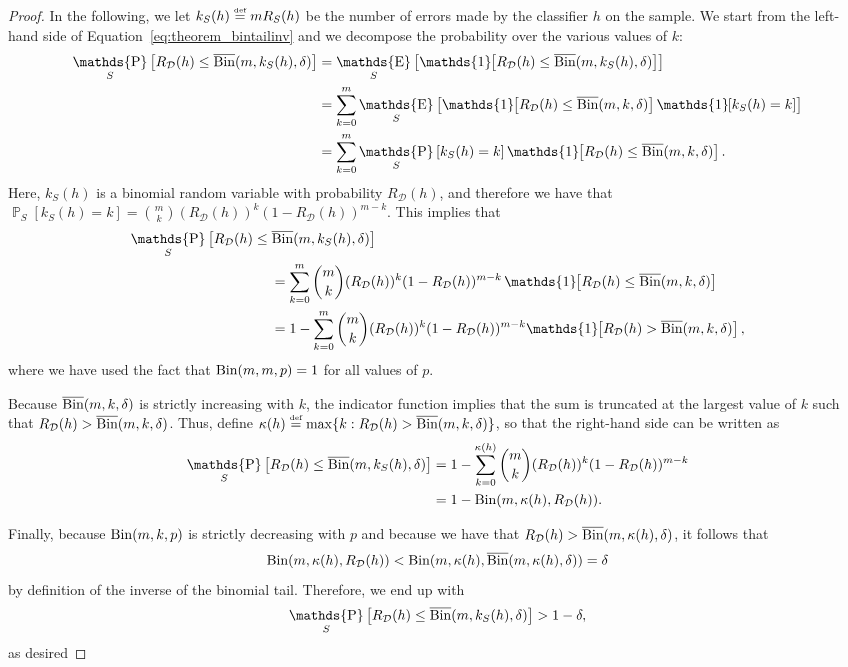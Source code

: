 \documentclass[twoside,11pt]{article}
\newcommand{\Id}[1]{\mathds{1}\hspace{-2.5pt}\left[#1\right]}
\newcommand{\D}{\mathcal{D}}
\newcommand{\eqdef}{\overset{\smash{\mbox{\tiny \rm def}}}{=}}
\DeclareMathOperator*{\Prob}{\mathds{P}}
\newcommand{\prob}[2]{\Prob_{#1}\left[#2\right]}
\DeclareMathOperator*{\Expectation}{\mathds{E}}
\newcommand{\exv}[2]{\Expectation_{#1}\left[#2\right]}
\newcommand{\Bin}{\textnormal{Bin}}
\newcommand{\BinInv}{\overline{\textnormal{Bin}}}
\begin{document}
\begin{proof}
In the following, we let $k_S(h) \eqdef m R_S(h)$ be the number of errors made by the classifier $h$ on the sample.
We start from the left-hand side of Equation~\eqref{eq:theorem_bintailinv} and we decompose the probability over the various values of $k$:
\begin{align*}
\prob{S}{R_\D(h) \leq \BinInv(m, k_S(h), \delta)}
	&= \exv{S}{ \Id{R_\D(h)\leq \BinInv(m, k_S(h), \delta)} }\\
	&= \sum_{k=0}^{m} \exv{S}{ \Id{R_\D(h)\leq \BinInv(m, k, \delta)} \Id{k_S(h) = k} }\\
	&= \sum_{k=0}^{m} \prob{S}{ k_S(h) = k } \Id{R_\D(h)\leq \BinInv(m, k, \delta)}.
\end{align*}
Here, $k_S(h)$ is a binomial random variable with probability $R_\D(h)$, and therefore we have that $\prob{S}{ k_S(h) = k } = \binom{m}{k} (R_\D(h))^k (1 - R_\D(h))^{m-k}$.
This implies that 
\begin{align*}
\prob{S}{R_\D(h) \leq \BinInv(m, k_S(h), \delta)}&\\
	&\hspace{-75pt}= \sum_{k=0}^{m} \binom{m}{k} (R_\D(h))^k (1 - R_\D(h))^{m-k}\, \Id{R_\D(h)\leq \BinInv(m, k, \delta)}\\
	&\hspace{-75pt}=1 - \sum_{k=0}^{m} \binom{m}{k} (R_\D(h))^k (1 - R_\D(h))^{m-k} \Id{R_\D(h)> \BinInv(m, k, \delta)},
\end{align*}
where we have used the fact that $\Bin(m, m, p) = 1$ for all values of $p$.

Because $\BinInv(m,k,\delta)$ is strictly increasing with $k$, the indicator function implies that the sum is truncated at the largest value of $k$ such that $R_\D(h) > \BinInv(m,k,\delta)$.
Thus, define $\kappa(h) \eqdef \max\{ k:R_\D(h) > \BinInv(m,k,\delta)\}$, so that the right-hand side can be written as
\begin{align*}
\prob{S}{R_\D(h) \leq \BinInv(m, k_S(h), \delta)}
	&=1 - \sum_{k=0}^{\kappa(h)} \binom{m}{k} (R_\D(h))^k (1 - R_\D(h))^{m-k}\\
	&=1 - \Bin(m, \kappa(h), R_\D(h)).
\end{align*}

Finally, because $\Bin(m,k,p)$ is strictly decreasing with $p$ and because we have that $R_\D(h) > \BinInv(m, \kappa(h), \delta)$, it follows that
\begin{equation*}
    \Bin(m, \kappa(h), R_\D(h)) < \Bin(m, \kappa(h), \BinInv(m, \kappa(h), \delta))=\delta
\end{equation*} by definition of the inverse of the binomial tail.
Therefore, we end up with
\begin{equation*}
\prob{S}{R_\D(h) \leq \BinInv(m, k_S(h), \delta)} > 1 - \delta,
\end{equation*}
as desired
\end{proof}
\end{document}
